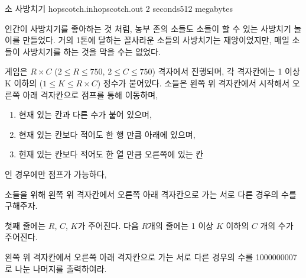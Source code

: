 \begin{problem}{소 사방치기}
	{hopscotch.in}{hopscotch.out}
	{2 seconds}{512 megabytes}{}
	
	인간이 사방치기를 좋아하는 것 처럼, 농부 존의 소들도 소들이 할 수 있는 사방치기 놀이를 만들었다. 거의 1톤에 달하는 꼴사라운 소들의 사방치기는 재앙이었지만, 매일 소들이 사방치기를 하는 것을 막을 수는 없었다.
	
	게임은 $R \times C$ ($2 \le R \le 750$, $2 \le C \le 750$) 격자에서 진행되며, 각 격자칸에는 1 이상 K 이하의 ($1 \le K \le R\times C$) 정수가 붙어있다. 소들은 왼쪽 위 격자칸에서 시작해서 오른쪽 아래 격자칸으로 점프를 통해 이동하며,
	
	\begin{enumerate}
		\item 현재 있는 칸과 다른 수가 붙어 있으며,
		\item 현재 있는 칸보다 적어도 한 행 만큼 아래에 있으며,
		\item 현재 있는 칸보다 적어도 한 열 만큼 오른쪽에 있는 칸
	\end{enumerate}

	인 경우에만 점프가 가능하다,
	
	소들을 위해 왼쪽 위 격자칸에서 오른쪽 아래 격자칸으로 가는 서로 다른 경우의 수를 구해주자.
	
	\InputFile
	
	첫째 줄에는 $R$, $C$, $K$가 주어진다. 다음 $R$개의 줄에는 1 이상 $K$ 이하의 $C$ 개의 수가 주어진다.
	
	\OutputFile
	
	왼쪽 위 격자칸에서 오른쪽 아래 격자칸으로 가는 서로 다른 경우의 수를 1000000007로 나눈 나머지를 출력하여라.
	
	
	\Constraints
		
	\begin{example}
	\end{example}

	
\end{problem}

